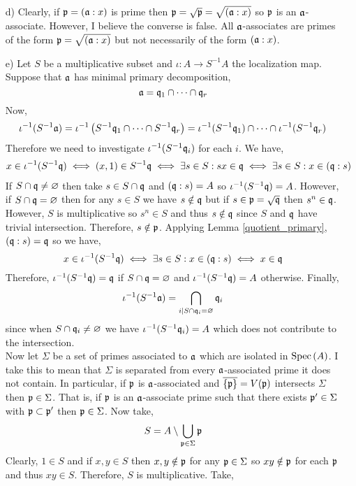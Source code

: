 \documentclass[12pt]{extarticle}
\begin{document}
\begin{enumerate}
\item[d)]
Clearly, if $\mathfrak{p} = (\mathfrak{a} : x)$ is prime then $\mathfrak{p} = \sqrt{\mathfrak{p}} = \sqrt{(\mathfrak{a} : x)}$ so $\mathfrak{p}$ is an $\mathfrak{a}$-associate. However, I believe the converse is false. All $\mathfrak{a}$-associates are primes of the form $\mathfrak{p} = \sqrt{(\mathfrak{a} : x)}$ but not necessarily of the form $(\mathfrak{a} : x)$. 

\item[e)]
Let $S$ be a multiplicative subset and $\iota : A \to S^{-1} A$ the localization map. Suppose that $\mathfrak{a}$ has minimal primary decomposition,
\[ \mathfrak{a} = \mathfrak{q}_1 \cap \cdots \cap \mathfrak{q}_r \]
Now,
\[ \iota^{-1}(S^{-1} \mathfrak{a}) = \iota^{-1} \left( S^{-1} \mathfrak{q}_1 \cap \cdots \cap S^{-1} \mathfrak{q}_r \right) = \iota^{-1}(S^{-1} \mathfrak{q}_1) \cap \cdots \cap \iota^{-1}(S^{-1} \mathfrak{q}_r) \]
Therefore we need to investigate $\iota^{-1}(S^{-1} \mathfrak{q}_i)$ for each $i$. We have,
\begin{align*}
x \in \iota^{-1}(S^{-1} \mathfrak{q}) \iff (x,1) \in S^{-1} \mathfrak{q} \iff \exists s \in S : s x \in \mathfrak{q} \iff \exists s \in S : x \in (\mathfrak{q} : s) 
\end{align*}
If $S \cap \mathfrak{q} \neq \varnothing$ then take $s \in S \cap \mathfrak{q}$ and $(\mathfrak{q} : s) = A$ so $\iota^{-1}(S^{-1} \mathfrak{q}) = A$. However, if $S \cap \mathfrak{q} = \varnothing$ then for any $s \in S$ we have $s \notin \mathfrak{q}$ but if $s \in \mathfrak{p} = \sqrt{\mathfrak{q}}$ then $s^n \in \mathfrak{q}$. However, $S$ is multiplicative so $s^n \in S$ and thus $s \notin \mathfrak{q}$ since $S$ and $\mathfrak{q}$ have trivial intersection. Therefore, $s \notin \mathfrak{p}$. Applying Lemma \ref{quotient_primary}, $(\mathfrak{q} : s) = \mathfrak{q}$ so we have,
\[ x \in \iota^{-1}(S^{-1}\mathfrak{q}) \iff \exists s \in S : x \in (\mathfrak{q} : s) \iff x \in \mathfrak{q} \]
Therefore, $\iota^{-1}(S^{-1}\mathfrak{q}) = \mathfrak{q}$ if $S \cap \mathfrak{q} = \varnothing$ and $\iota^{-1}(S^{-1}\mathfrak{q}) = A$ otherwise. Finally,
\[ \iota^{-1}(S^{-1} \mathfrak{a}) = \bigcap_{i \mid S \cap \mathfrak{q}_i = \varnothing} \mathfrak{q}_i \]
since when $S \cap \mathfrak{q}_i \neq \varnothing$ we have $\iota^{-1}(S^{-1} \mathfrak{q}_i) = A$ which does not contribute to the intersection. 
\bigskip\\
Now let $\Sigma$ be a set of primes associated to $\mathfrak{a}$ which are isolated in $\mathrm{Spec}\left( A \right)$. I take this to mean that $\Sigma$ is separated from every $\mathfrak{a}$-associated prime it does not contain. In particular, if $\mathfrak{p}$ is $\mathfrak{a}$-associated and $\overline{\{ \mathfrak{p} \}} = V(\mathfrak{p})$ intersects $\Sigma$ then $\mathfrak{p} \in \Sigma$. That is, if $\mathfrak{p}$ is an $\mathfrak{a}$-associate prime such that there exists $\mathfrak{p}' \in \Sigma$ with $\mathfrak{p} \subset \mathfrak{p}'$ then $\mathfrak{p} \in \Sigma$.
Now take,
\[ S = A \setminus \bigcup_{\mathfrak{p} \in \Sigma} \mathfrak{p} \]
Clearly, $1 \in S$ and if $x, y \in S$ then $x,y \notin \mathfrak{p}$ for any $\mathfrak{p} \in \Sigma$ so $xy \notin \mathfrak{p}$ for each $\mathfrak{p}$ and thus $x y \in S$. Therefore, $S$ is multiplicative. Take,

\end{enumerate}
\end{document}
